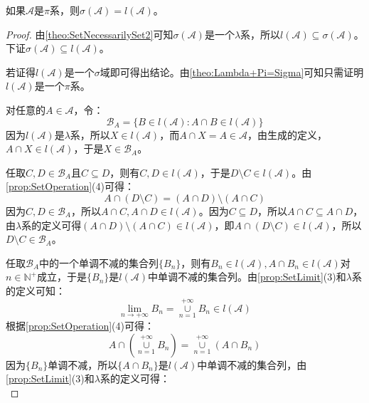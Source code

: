 \begin{theorem}\label{theo:SigmaPi=LambdaPi}
	如果$\mathscr{A}$是$\pi$系，则$\sigma(\mathscr{A})=l(\mathscr{A})$。
\end{theorem}
\begin{proof}
	由\cref{theo:SetNecessarilySet2}可知$\sigma(\mathscr{A})$是一个$\lambda$系，所以$l(\mathscr{A})\subseteq\sigma(\mathscr{A})$。下证$\sigma(\mathscr{A})\subseteq l(\mathscr{A})$。\par
	若证得$l(\mathscr{A})$是一个$\sigma$域即可得出结论。由\cref{theo:Lambda+Pi=Sigma}可知只需证明$l(\mathscr{A})$是一个$\pi$系。\par
	对任意的$A\in\mathscr{A}$，令：
	\begin{equation*}
		\mathscr{B}_A=\{B\in l(\mathscr{A}):A\cap B\in l(\mathscr{A})\}
	\end{equation*}
	因为$l(\mathscr{A})$是$\lambda$系，所以$X\in l(\mathscr{A})$，而$A\cap X=A\in\mathscr{A}$，由生成的定义，$A\cap X\in l(\mathscr{A})$，于是$X\in\mathscr{B}_A$。\par
	任取$C,D\in\mathscr{B}_A$且$C\subseteq D$，则有$C,D\in l(\mathscr{A})$，于是$D\setminus C\in l(\mathscr{A})$。由\cref{prop:SetOperation}(4)可得：
	\begin{equation*}
		A\cap(D\setminus C)=(A\cap D)\setminus(A\cap C)
	\end{equation*}
	因为$C,D\in\mathscr{B}_A$，所以$A\cap C,A\cap D\in l(\mathscr{A})$。因为$C\subseteq D$，所以$A\cap C\subseteq A\cap D$，由$\lambda$系的定义可得$(A\cap D)\setminus(A\cap C)\in l(\mathscr{A})$，即$A\cap(D\setminus C)\in l(\mathscr{A})$，所以$D\setminus C\in\mathscr{B}_A$。\par
	任取$\mathscr{B}_A$中的一个单调不减的集合列$\{B_n\}$，则有$B_n\in l(\mathscr{A}),A\cap B_n\in l(\mathscr{A})$对$n\in\mathbb{N}^+$成立，于是$\{B_n\}$是$l(\mathscr{A})$中单调不减的集合列。由\cref{prop:SetLimit}(3)和$\lambda$系的定义可知：
	\begin{equation*}
		\lim_{n\to+\infty}B_n=\underset{n=1}{\overset{+\infty}{\cup}}B_n\in l(\mathscr{A})
	\end{equation*}
	根据\cref{prop:SetOperation}(4)可得：
	\begin{equation*}
		A\cap\left(\underset{n=1}{\overset{+\infty}{\cup}}B_n\right)
		=\underset{n=1}{\overset{+\infty}{\cup}}(A\cap B_n)
	\end{equation*}
	因为$\{B_n\}$单调不减，所以$\{A\cap B_n\}$是$l(\mathscr{A})$中单调不减的集合列，由\cref{prop:SetLimit}(3)和$\lambda$系的定义可得：
	\begin{equation*}

\end{equation*}
\end{proof}
